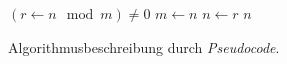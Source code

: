 \begin{figure}
    \centering
    \begin{minipage}[c]{0.8\textwidth}
        \begin{codebox}
            \li \While $(r \gets n \mod m) \neq 0$
            \li     \Do
                        $m \gets n$                 \label{ln:euclid-while-begin}
            \li         $n \gets r$                 \label{ln:euclid-while-end}
                    \End
            \li \Return $n$                         \label{ln:euclid-return}
        \end{codebox}
    \end{minipage}
    \caption{Algorithmusbeschreibung durch \emph{Pseudocode}.}
    \label{fig:pseudocode-algorithm-specification}
\end{figure}
